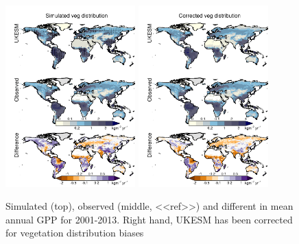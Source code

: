 \begin{figure}[t]
        \includegraphics[width=5cm]{figs/GPP/fire_var_seasonality-maps-AA-mapscontrol-gpp.png}
        \includegraphics[width=5cm]{figs/GPP/fire_var_seasonality-maps-AA-mapsobsVegDist-gpp.png}
    
    \caption{Simulated (top), observed (middle, <<ref>>) and different in mean annual GPP for 2001-2013. Right hand, UKESM has been corrected for vegetation distribution biases \label{fig:GPPmap}}
\end{figure}

